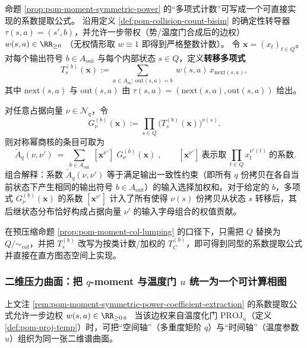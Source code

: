 \begin{remark}\label{rem:pom-moment-symmetric-power-coefficient-extraction}
命题 \ref{prop:pom-moment-symmetric-power} 的“多项式计数”可写成一个可直接实现的系数提取公式。
沿用定义 \ref{def:pom-collision-count-bisim} 的确定性转导器 \(\tau(s,a)=(s',b)\)，并允许一步带权（势/温度门合成后的边权）
\(
w(s,a)\in\RR_{\ge 0}
\)
（无权情形取 \(w\equiv 1\) 即得到严格整数计数）。
令 \(\mathbf{x}=(x_t)_{t\in Q}\)。
对每个输出符号 \(b\in A_{\mathrm{out}}\) 与每个内部状态 \(s\in Q\)，定义\textbf{转移多项式}
\[
T_{s}^{(b)}(\mathbf{x})
:=\sum_{a\in A_{\mathrm{in}}:\ \mathrm{out}(s,a)=b}\ w(s,a)\,x_{\mathrm{next}(s,a)},
\]
其中 \(\mathrm{next}(s,a)\) 与 \(\mathrm{out}(s,a)\) 由 \(\tau(s,a)=(\mathrm{next}(s,a),\mathrm{out}(s,a))\) 给出。
\par
对任意占据向量 \(\nu\in\mathcal{N}_q\)，令
\[
G_{\nu}^{(b)}(\mathbf{x})
:=\prod_{s\in Q}\bigl(T_s^{(b)}(\mathbf{x})\bigr)^{\nu(s)}.
\]
则对称幂商核的条目可取为
\[
\boxed{\;
\widetilde A_q(\nu,\nu')
\ =\
\sum_{b\in A_{\mathrm{out}}}\ [\mathbf{x}^{\nu'}]\;G_{\nu}^{(b)}(\mathbf{x})\;},
\qquad
[\mathbf{x}^{\nu'}]\ \text{表示取}\ \prod_{t\in Q}x_t^{\nu'(t)}\ \text{的系数}.
\]
组合解释：系数 \(\widetilde A_q(\nu, \nu')\) 等于满足输出一致性约束（即所有 \(q\) 份拷贝在各自当前状态下产生相同的输出符号 \(b \in A_{\mathrm{out}}\)）的输入选择加权和。对于给定的 \(b\)，多项式 \(G_{\nu}^{(b)}(\mathbf{x})\) 的系数 \([\mathbf{x}^{\nu'}]\) 计入了所有使得 \(\nu(s)\) 份拷贝从状态 \(s\) 转移后，其后继状态分布恰好构成占据向量 \(\nu'\) 的输入字母组合的权值贡献。
\par
在预压缩命题 \ref{prop:pom-moment-col-lumping} 的口径下，只需把 \(Q\) 替换为 \(Q/{\sim_{\mathrm{col}}}\)，并把 \(T_s^{(b)}\) 改写为按类计数/加权的 \(T_C^{(b)}\)，即可得到同型的系数提取公式并直接在直方图态空间上实现。
\end{remark}

\subsubsection{二维压力曲面：把 \texorpdfstring{$q$}{q}-moment 与温度门 \texorpdfstring{$u$}{u} 统一为一个可计算相图}\label{subsec:pom-pressure-surface-qu}

上文注 \ref{rem:pom-moment-symmetric-power-coefficient-extraction} 的系数提取公式允许一步边权
\(
w(s,a)\in\RR_{\ge 0}
\)。
当该边权来自温度化门 \(\mathrm{PROJ}_u\)（定义 \ref{def:pom-proj-temp}）时，可把“空间轴”（多重度矩阶 \(q\)）与“时间轴”（温度参数 \(u\)）组织为同一张二维谱曲面。

